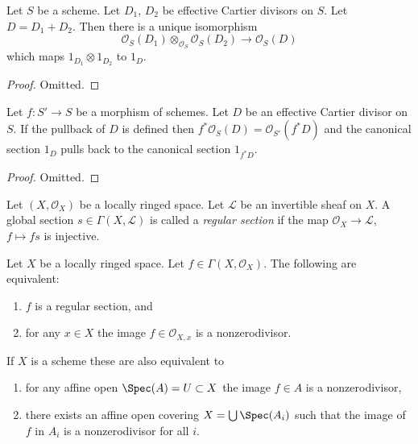 \begin{lemma}
\label{lemma-invertible-sheaf-sum-effective-Cartier-divisors}
Let $S$ be a scheme.
Let $D_1$, $D_2$ be effective Cartier divisors on $S$.
Let $D = D_1 + D_2$.
Then there is a unique isomorphism
$$
\mathcal{O}_S(D_1) \otimes_{\mathcal{O}_S} \mathcal{O}_S(D_2)
\longrightarrow
\mathcal{O}_S(D)
$$
which maps $1_{D_1} \otimes 1_{D_2}$ to $1_D$.
\end{lemma}

\begin{proof}
Omitted.
\end{proof}

\begin{lemma}
\label{lemma-pullback-effective-Cartier-divisors}
Let $f : S' \to S$ be a morphism of schemes.
Let $D$ be an effective Cartier divisor on $S$.
If the pullback of $D$ is defined then
$f^*\mathcal{O}_S(D) = \mathcal{O}_{S'}(f^*D)$
and the canonical section $1_D$ pulls back to
the canonical section $1_{f^*D}$.
\end{lemma}

\begin{proof}
Omitted.
\end{proof}

\begin{definition}
\label{definition-regular-section}
Let $(X, \mathcal{O}_X)$ be a locally ringed space.
Let $\mathcal{L}$ be an invertible sheaf on $X$.
A global section $s \in \Gamma(X, \mathcal{L})$ is called a
{\it regular section} if the map $\mathcal{O}_X \to \mathcal{L}$,
$f \mapsto fs$ is injective.
\end{definition}

\begin{lemma}
\label{lemma-regular-section-structure-sheaf}
Let $X$ be a locally ringed space. Let $f \in \Gamma(X, \mathcal{O}_X)$.
The following are equivalent:
\begin{enumerate}
\item $f$ is a regular section, and
\item for any $x \in X$ the image $f \in \mathcal{O}_{X, x}$
is a nonzerodivisor.
\end{enumerate}
If $X$ is a scheme these are also equivalent to
\begin{enumerate}
\item[(3)] for any affine open $\Spec(A) = U \subset X$
the image $f \in A$ is a nonzerodivisor,
\item[(4)] there exists an affine open covering
$X = \bigcup \Spec(A_i)$ such that
the image of $f$ in $A_i$ is a nonzerodivisor for all $i$.
\end{enumerate}
\end{lemma}


